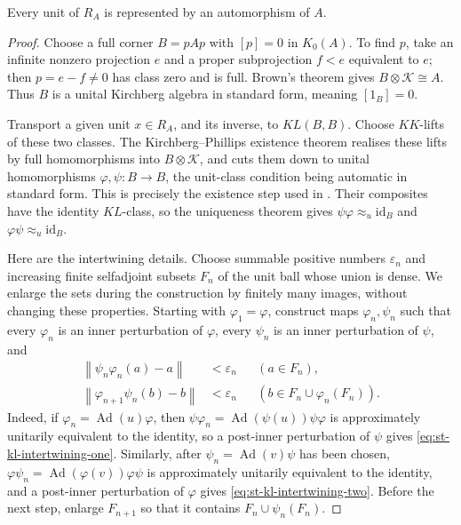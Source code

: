 \begin{lemma}\label{lem:st-kl-realization}
 Every unit of $R_A$ is represented by an
automorphism of $A$.
\end{lemma}

\begin{proof}
Choose a full corner $B=pAp$ with $[p]=0$ in $K_0(A)$. To find $p$, take an
infinite nonzero projection $e$ and a proper subprojection $f<e$ equivalent
to $e$; then $p=e-f\ne0$ has class zero and is full. Brown's theorem gives $B\otimes\mathcal{K}\cong A$. Thus $B$ is a unital Kirchberg algebra in
standard form, meaning $[1_B]=0$.

Transport a given unit $x\in R_A$, and its inverse, to $KL(B,B)$. Choose $KK$-lifts of these two classes. The Kirchberg--Phillips existence theorem
\cite[Theorem~8.2.1(i)]{RordamStormer2002} realises these lifts by full
homomorphisms into $B\otimes\mathcal{K}$, and
\cite[Proposition~4.1.4]{RordamStormer2002} cuts them down to unital
homomorphisms $\varphi,\psi:B\to B$, the unit-class condition being
automatic in standard form. This is precisely the existence step used in
\cite[proof of Theorem~5.1(a)]{Dadarlat2005}. Their composites have the identity $KL$-class,
so the uniqueness theorem gives $\psi\varphi\approx_u\mathrm{id}_B$ and $\varphi\psi\approx_u\mathrm{id}_B$.

Here are the intertwining details. Choose summable positive numbers $\varepsilon_n$ and increasing finite selfadjoint subsets $F_n$ of the unit
ball whose union is dense. We enlarge the sets during the construction by
finitely many images, without changing these properties. Starting with $\varphi_1=\varphi$, construct maps $\varphi_n,\psi_n$ such that every $\varphi_n$ is an inner perturbation of $\varphi$, every $\psi_n$ is an inner
perturbation of $\psi$, and 
\begin{align}
\left\|\psi_n\varphi_n(a)-a\right\|&<\varepsilon_n & &(a\in F_n),
\label{eq:st-kl-intertwining-one} \\
\left\|\varphi_{n+1}\psi_n(b)-b\right\|&<\varepsilon_n & &(b\in
F_n\cup\varphi_n(F_n)).  \label{eq:st-kl-intertwining-two}
\end{align}
Indeed, if $\varphi_n=\operatorname{Ad}(u)\varphi$, then $\psi\varphi_n=\operatorname{Ad} (\psi(u))\psi\varphi$ is approximately unitarily equivalent to the identity,
so a post-inner perturbation of $\psi$ gives \eqref{eq:st-kl-intertwining-one}.
Similarly, after $\psi_n=\operatorname{Ad}(v)\psi$ has been chosen, $\varphi\psi_n=\operatorname{Ad} (\varphi(v))\varphi\psi$ is approximately unitarily equivalent to the
identity, and a post-inner perturbation of $\varphi$ gives \eqref{eq:st-kl-intertwining-two}. Before the next step, enlarge $F_{n+1}$ so
that it contains $F_n\cup\psi_n(F_n)$.


\end{proof}
